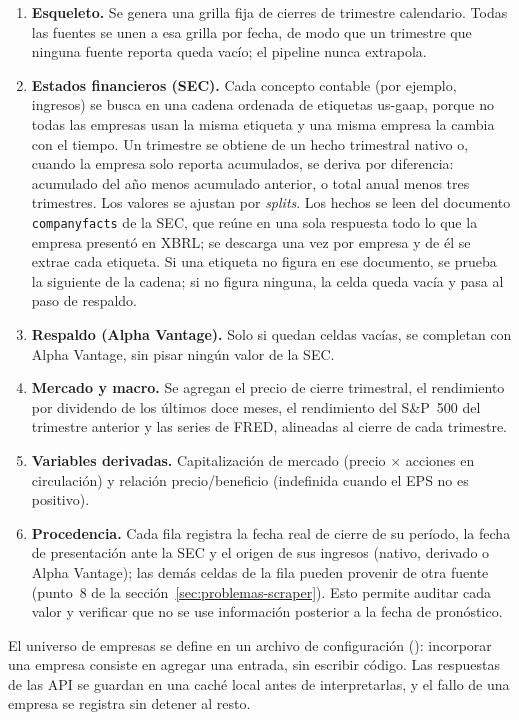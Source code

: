 \documentclass[12pt,letterpaper,oneside]{report}
\renewcommand{\_}{\UnderscoreOriginal\allowbreak}
\begin{document}
\begin{enumerate}
  \item \textbf{Esqueleto.} Se genera una grilla fija de cierres de trimestre calendario. Todas las fuentes se unen a esa grilla por fecha, de modo que un trimestre que ninguna fuente reporta queda vacío; el pipeline nunca extrapola.
  \item \textbf{Estados financieros (SEC).} Cada concepto contable (por ejemplo, ingresos) se busca en una cadena ordenada de etiquetas us-gaap, porque no todas las empresas usan la misma etiqueta y una misma empresa la cambia con el tiempo. Un trimestre se obtiene de un hecho trimestral nativo o, cuando la empresa solo reporta acumulados, se deriva por diferencia: acumulado del año menos acumulado anterior, o total anual menos tres trimestres. Los valores se ajustan por \textit{splits}. Los hechos se leen del documento \texttt{companyfacts} de la SEC, que reúne en una sola respuesta todo lo que la empresa presentó en XBRL; se descarga una vez por empresa y de él se extrae cada etiqueta. Si una etiqueta no figura en ese documento, se prueba la siguiente de la cadena; si no figura ninguna, la celda queda vacía y pasa al paso de respaldo.
  \item \textbf{Respaldo (Alpha Vantage).} Solo si quedan celdas vacías, se completan con Alpha Vantage, sin pisar ningún valor de la SEC.
  \item \textbf{Mercado y macro.} Se agregan el precio de cierre trimestral, el rendimiento por dividendo de los últimos doce meses, el rendimiento del S\&P~500 del trimestre anterior y las series de FRED, alineadas al cierre de cada trimestre.
  \item \textbf{Variables derivadas.} Capitalización de mercado (precio $\times$ acciones en circulación) y relación precio/beneficio (indefinida cuando el EPS no es positivo).
  \item \textbf{Procedencia.} Cada fila registra la fecha real de cierre de su período, la fecha de presentación ante la SEC y el origen de sus ingresos (nativo, derivado o Alpha Vantage); las demás celdas de la fila pueden provenir de otra fuente (punto~8 de la sección~\ref{sec:problemas-scraper}). Esto permite auditar cada valor y verificar que no se use información posterior a la fecha de pronóstico.
\end{enumerate}

El universo de empresas se define en un archivo de configuración (): incorporar una empresa consiste en agregar una entrada, sin escribir código. Las respuestas de las API se guardan en una caché local antes de interpretarlas, y el fallo de una empresa se registra sin detener al resto.
\end{document}
